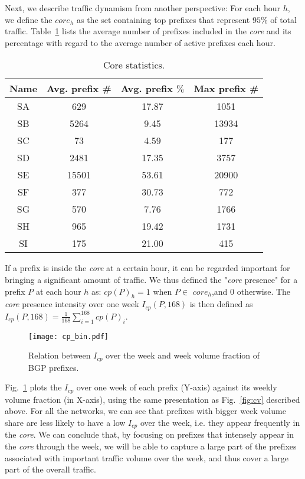 \documentclass[10pt, conference,letterpaper]{IEEEtran}
\begin{document}
Next, we describe traffic dynamism from another perspective:
For each hour $h$, we define the $core_h$ as the set containing top prefixes that represent $95\%$ of total traffic. 
Table~\ref{tab:core_size} lists the average number of prefixes included in the \textit{core} and its percentage with regard to the average number of active prefixes each hour. 


\begin{table}[!tb]
\centering
\begin{tabular}{cccc}\toprule
\textbf{Name} & \textbf{Avg. prefix \#} & \textbf{Avg. prefix $\%$} & \textbf{Max prefix \#}\\
\midrule
SA & 629  & 17.87  & 1051\\
SB & 5264 & 9.45  & 13934\\
SC & 73  & 4.59    & 177\\
SD & 2481  & 17.35 & 3757\\
SE & 15501  & 53.61 & 20900\\
SF & 377  & 30.73    & 772\\
SG & 570 & 7.76    & 1766\\
SH & 965  & 19.42   & 1731\\
SI & 175  & 21.00    & 415\\
\bottomrule
\end{tabular}
\caption{Core statistics.}
\label{tab:core_size}
\end{table}

If a prefix is inside the \textit{core} at a certain hour, it can be regarded important for bringing a significant amount of traffic.
We thus defined the "\textit{core} presence" for a prefix $P$ at each hour $h$ as:
$cp(P)_h = 1 $ when $P \in$ $core_h$,and 0 otherwise. The \textit{core} presence intensity over one week $I_{cp}(P, 168)$ is then defined as $I_{cp}(P,168) = \frac{1}{168} \sum_{i=1}^{168} cp(P)_i$.


\begin{figure}[!tb]
\centering
\texttt{[image: cp\_bin.pdf]}
\caption{Relation between $I_{cp}$ over the week and week volume fraction of BGP prefixes. 
}
\label{fig:cpi}
\end{figure}

Fig.~\ref{fig:cpi} plots the $I_{cp}$ over one week of each prefix (Y-axis) against its weekly volume fraction (in X-axis), using the same presentation as Fig.~\ref{fig:cv} described above.
For all the networks, we can see that prefixes with bigger week volume share are less likely to have a low $I_{cp}$ over the week, i.e. they appear frequently in the \textit{core}.
We can conclude that, by focusing on prefixes that intensely appear in the \textit{core} through the week, we will be able to capture a large part of the prefixes associated with important traffic volume over the week, and thus cover a large part of the overall traffic.
\end{document}
